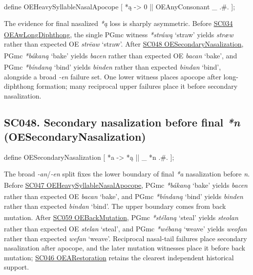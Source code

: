\documentclass[
  british,
  a4paper,
  openany]{book}
\providecommand{\Pred}[1]{\textsuperscript{\dag}\emph{#1}}
\providecommand{\Recon}[1]{\emph{*#1}}
{\catcode`→=\active \global\def→{\ensuremath{\rightarrow}}}
\providecommand{\texorpdfstring}[2]{#1}
\DeclareRobustCommand{\CAPRRuleHeading}[2]{%
  #1\texorpdfstring{\\(#2)}{ (#2)}%
}
\providecommand{\Pred}[1]{\textsuperscript{\dag}\emph{#1}}
\providecommand{\Recon}[1]{\emph{*#1}}
{\catcode`→=\active \global\def→{\ensuremath{\rightarrow}}}
\begin{document}
\begin{ReaderFacingFoma}
define OEHeavySyllableNasalApocope [
    {*ą} -> 0 || OEAnyConsonant _ .#.
];
\end{ReaderFacingFoma}

The evidence for final nasalized \emph{*ą} loss is sharply asymmetric.
Before \hyperref[rule-OEAwLongDiphthong]{SC034 OEAwLongDiphthong}, the
single PGmc witness \Recon{stráwą} `straw' yields \Pred{stræw} rather
than expected OE \emph{strēaw} `straw'. After
\hyperref[rule-OESecondaryNasalization]{SC048 OESecondaryNasalization},
PGmc \Recon{bákaną} `bake' yields \Pred{bacen} rather than expected OE
\emph{bacan} `bake', and PGmc \Recon{bíndaną} `bind' yields
\Pred{binden} rather than expected \emph{bindan} `bind', alongside a
broad \emph{-en} failure set. One lower witness places apocope after
long-diphthong formation; many reciprocal upper failures place it before
secondary nasalization.

\subsection{\texorpdfstring{\CAPRRuleHeading{SC048. Secondary nasalization before final \emph{*n}}{OESecondaryNasalization}}{}}\label{rule-OESecondaryNasalization}

\begin{ReaderFacingFoma}
define OESecondaryNasalization [
    {*a} -> {*ą} || _ {*n} .#.
];
\end{ReaderFacingFoma}

The broad \emph{-an}/\emph{-en} split fixes the lower boundary of final
\emph{*a} nasalization before \emph{n}. Before
\hyperref[rule-OEHeavySyllableNasalApocope]{SC047
OEHeavySyllableNasalApocope}, PGmc \Recon{bákaną} `bake' yields
\Pred{bacen} rather than expected OE \emph{bacan} `bake', and PGmc
\Recon{bíndaną} `bind' yields \Pred{binden} rather than expected
\emph{bindan} `bind'. The upper boundary comes from back mutation. After
\hyperref[rule-OEBackMutation]{SC059 OEBackMutation}, PGmc
\Recon{stélaną} `steal' yields \Pred{steolan} rather than expected OE
\emph{stelan} `steal', and PGmc \Recon{wébaną} `weave' yields
\Pred{weofan} rather than expected \emph{wefan} `weave'. Reciprocal
nasal-tail failures place secondary nasalization after apocope, and the
later mutation witnesses place it before back mutation;
\hyperref[rule-OEARestoration]{SC046 OEARestoration} retains the
clearest independent historical support.

\newpage
\end{document}
